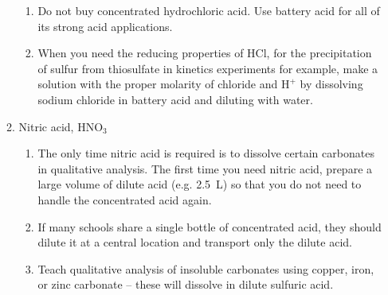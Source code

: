 \begin{enumerate}
\begin{enumerate}
\begin{enumerate}
\item{Do not buy concentrated hydrochloric acid. 
Use battery acid for all of its strong acid applications.}
\item{When you need the reducing properties of HCl, 
for the precipitation of sulfur from thiosulfate 
in kinetics experiments for example, 
make a solution with the proper molarity of chloride and $\mbox{H}^{+}$ 
by dissolving sodium chloride in battery acid and diluting with water.}
\end{enumerate}
\item{Nitric acid, $\mbox{HNO}_{3}$}
\begin{enumerate}
\item{The only time nitric acid is required 
is to dissolve certain carbonates in qualitative analysis. 
The first time you need nitric acid, 
prepare a large volume of dilute acid (e.g. 2.5~L) 
so that you do not need to handle the concentrated acid again.}
\item{If many schools share a single bottle of concentrated acid, 
they should dilute it at a central location and transport only the dilute acid.}
\item{Teach qualitative analysis of insoluble carbonates 
using copper, iron, or zinc carbonate -- 
these will dissolve in dilute sulfuric acid.}
\end{enumerate}
\end{enumerate}


\end{enumerate}
